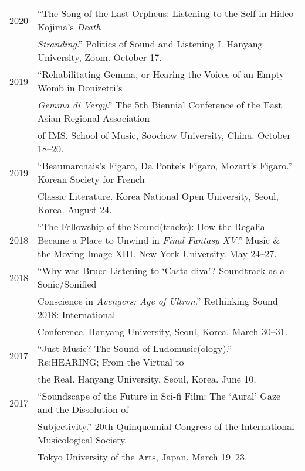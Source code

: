 \documentclass[a4paper,11pt,draft]{article}
\begin{document}
  \hspace*{-0.25cm}
  \begin{tabular}{p{2.5cm} p{12.5cm}}
    2020 & “The Song of the Last Orpheus: Listening to the Self in Hideo Kojima’s \textit{Death}\\
    & \textit{Stranding}.” Politics of Sound and Listening I. Hanyang University, Zoom. October 17.\\[2mm]
  
    2019 & “Rehabilitating Gemma, or Hearing the Voices of an Empty Womb in
    Donizetti’s\\
    & \textit{Gemma di Vergy}.” The 5th Biennial Conference of the East Asian
    Regional Association\\
    & of IMS. School of Music, Soochow University, China. October 18–20.\\[2mm]
  
    2019 & “Beaumarchais’s Figaro, Da Ponte’s Figaro, Mozart’s Figaro.” Korean
    Society for French\\
    & Classic Literature. Korea National Open University, Seoul, Korea. August
    24.\\[2mm]
  
    2018 & “The Fellowship of the Sound(tracks): How the Regalia Became a Place
    to Unwind in \textit{Final Fantasy XV}.” Music \& the Moving Image XIII.
    New York University. May 24--27.\\[2mm]
  
    2018 & “Why was Bruce Listening to ‘Casta diva’? Soundtrack as a
    Sonic/Sonified\\
    & Conscience in \textit{Avengers: Age of Ultron}.” Rethinking Sound 2018:
    International\\
    & Conference. Hanyang University, Seoul, Korea. March 30--31.\\[2mm]
  
    2017 & “Just Music? The Sound of Ludomusic(ology).” Re:HEARING; From the
    Virtual to\\
    & the Real. Hanyang University, Seoul, Korea. June 10.\\[2mm]
  
    2017 & “Soundscape of the Future in Sci-fi Film: The ‘Aural’ Gaze and the
    Dissolution of\\
    & Subjectivity.” 20th Quinquennial Congress of the International
    Musicological Society.\\
    & Tokyo University of the Arts, Japan. March 19--23.\\[2mm]
  

\end{tabular}
\end{document}
